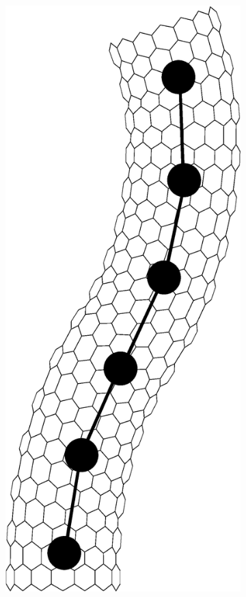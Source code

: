 \begin{figure}[t!]
\begin{subfigure}[t]{.33\textwidth}
			\caption{\label{subfig:Nanotube}}
		\end{subfigure}%
		~
		\begin{subfigure}[t]{.33\textwidth}
			\centering
			\includegraphics[scale=.25]{./fig/ch1/NanotubeParticle.eps}

\end{subfigure}
\end{figure}
